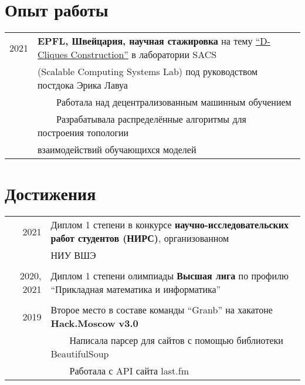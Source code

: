 \documentclass[a4paper,10pt]{article}
\newcommand{\tabitem}{~~\llap{\textbullet}~~}
\begin{document}
\section{Опыт работы}
\begin{tabular}{rl}
\hspace{0.9cm} 2021 & \textbf{EPFL, Швейцария, научная стажировка} на тему \href{https://www.epfl.ch/labs/sacs/completed-student-projects/}{``D-Cliques Construction''} в лаборатории SACS \\
& (Scalable Computing Systems Lab) под руководством постдока Эрика Лавуа\\
& \tabitem Работала над децентрализованным машинным обучением \\
& \tabitem Разрабатывала распределённые алгоритмы для построения топологии \\
& взаимодействий обучающихся моделей \\
\end{tabular}

\section{Достижения}
\begin{tabular}{rl}
\hspace{0.9cm} 2021 & Диплом 1 степени в конкурсе \textbf{научно-исследовательских работ студентов (НИРС)}, организованном \\
& НИУ ВШЭ \\
&\\
2020, 2021 & Диплом 1 степени олимпиады \textbf{Высшая лига} по профилю ``Прикладная математика и информатика'' \\
&\\
\hspace{0.9cm} 2019 & Второе место в составе команды ``Granb'' на хакатоне \textbf{Hack.Moscow v3.0} \\
& \tabitem Написала парсер для сайтов с помощью библиотеки BeautifulSoup \\
& \tabitem Работала с API сайта last.fm \\
\end{tabular}
\end{document}
